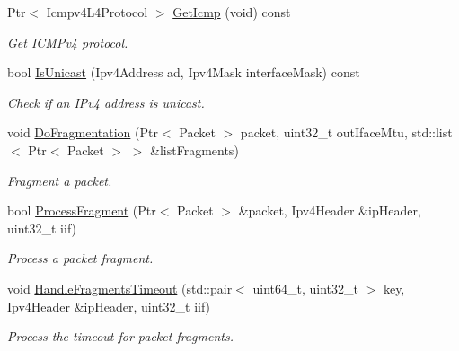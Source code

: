 \begin{DoxyCompactItemize}
Ptr$<$ Icmpv4\-L4\-Protocol $>$ \hyperlink{classns3_1_1Ipv4RouterL3Protocol_aa8e6f15b2933344444970aed21d8641b}{Get\-Icmp} (void) const 
\begin{DoxyCompactList}\small\item\em Get I\-C\-M\-Pv4 protocol. \end{DoxyCompactList}\item 
bool \hyperlink{classns3_1_1Ipv4RouterL3Protocol_a94898bc72665a0aa0f03d8ff15abd398}{Is\-Unicast} (Ipv4\-Address ad, Ipv4\-Mask interface\-Mask) const 
\begin{DoxyCompactList}\small\item\em Check if an I\-Pv4 address is unicast. \end{DoxyCompactList}\item 
void \hyperlink{classns3_1_1Ipv4RouterL3Protocol_aeefc9ca2a1cbc6fbd8a676f1bab18313}{Do\-Fragmentation} (Ptr$<$ Packet $>$ packet, uint32\-\_\-t out\-Iface\-Mtu, std\-::list$<$ Ptr$<$ Packet $>$ $>$ \&list\-Fragments)
\begin{DoxyCompactList}\small\item\em Fragment a packet. \end{DoxyCompactList}\item 
bool \hyperlink{classns3_1_1Ipv4RouterL3Protocol_a859787bf309c07234ea58e62d26634a0}{Process\-Fragment} (Ptr$<$ Packet $>$ \&packet, Ipv4\-Header \&ip\-Header, uint32\-\_\-t iif)
\begin{DoxyCompactList}\small\item\em Process a packet fragment. \end{DoxyCompactList}\item 
void \hyperlink{classns3_1_1Ipv4RouterL3Protocol_ac4719458e3fdcd9d7d696a070c479747}{Handle\-Fragments\-Timeout} (std\-::pair$<$ uint64\-\_\-t, uint32\-\_\-t $>$ key, Ipv4\-Header \&ip\-Header, uint32\-\_\-t iif)
\begin{DoxyCompactList}\small\item\em Process the timeout for packet fragments. \end{DoxyCompactList}\end{DoxyCompactItemize}
